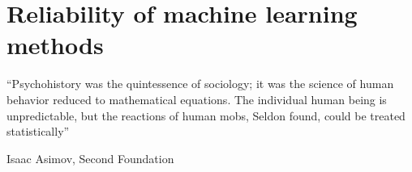 \chapter{Reliability of machine learning methods}
\label{sec:janne}

\epigraph{``Psychohistory was the quintessence of sociology; it was the science of human behavior reduced to mathematical equations. The individual human being is unpredictable, but the reactions of human mobs, Seldon found, could be treated statistically''}{Isaac Asimov, Second Foundation }
